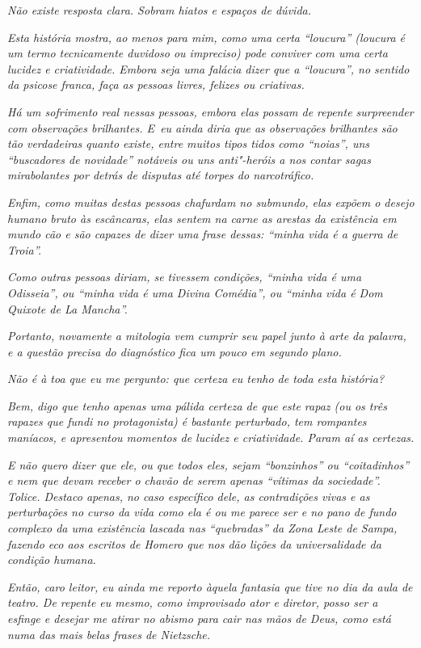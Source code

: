 \emph{Não existe resposta clara. Sobram hiatos e espaços de dúvida.}~

\emph{Esta história mostra, ao menos para mim, como uma certa ``loucura''
(loucura é um termo tecnicamente duvidoso ou impreciso) pode conviver
com uma certa lucidez e criatividade. Embora seja uma falácia dizer que
a ``loucura'', no sentido da psicose franca, faça as pessoas livres,
felizes ou criativas.}~

\emph{Há um sofrimento real nessas pessoas, embora elas possam de
repente surpreender com observações brilhantes. E~eu ainda diria que as
observações brilhantes são tão verdadeiras quanto existe, entre muitos
tipos tidos como ``noias'', uns ``buscadores de novidade'' notáveis ou
uns anti"-heróis a nos contar sagas mirabolantes por detrás de disputas
até torpes do narcotráfico.}~

\emph{Enfim, como muitas destas pessoas chafurdam no submundo, elas
expõem o desejo humano bruto às escâncaras, elas sentem na carne as
arestas da existência em mundo cão e são capazes de dizer uma frase
dessas: ``minha vida é a guerra de Troia''.}~

\emph{Como outras pessoas diriam, se tivessem condições, ``minha vida é
uma Odisseia'', ou ``minha vida é uma Divina Comédia'', ou ``minha vida
é Dom Quixote de La Mancha''.}~

\emph{Portanto, novamente a mitologia vem cumprir seu papel junto à arte
da palavra, e a questão precisa do diagnóstico fica um pouco em segundo
plano.}~

\emph{Não é à toa que eu me pergunto: que certeza eu tenho de toda esta
história?}~

\emph{Bem, digo que tenho apenas uma pálida certeza de que este rapaz
(ou os três rapazes que fundi no protagonista) é bastante perturbado,
tem rompantes maníacos, e apresentou momentos de lucidez e criatividade.
Param aí as certezas.}

\emph{E não quero dizer que ele, ou que todos eles, sejam ``bonzinhos''
ou ``coitadinhos'' e nem que devam receber o chavão de serem apenas
``vítimas da sociedade''. Tolice. Destaco apenas, no caso específico
dele, as contradições vivas e as perturbações no curso da vida como ela
é ou me parece ser e no pano de fundo complexo da uma existência lascada
nas ``quebradas'' da Zona Leste de Sampa, fazendo eco aos escritos de
Homero que nos dão lições da universalidade da condição humana.}~

\emph{Então, caro leitor, eu ainda me reporto àquela fantasia que tive
no dia da aula de teatro. De repente eu mesmo, como improvisado ator e
diretor, posso ser a esfinge e desejar me atirar no abismo para cair nas
mãos de Deus, como está numa das mais belas frases de Nietzsche.}~

